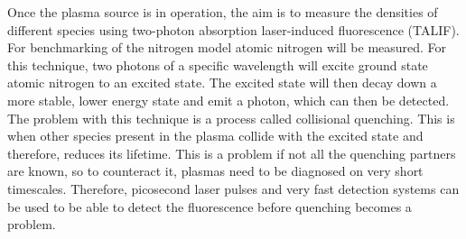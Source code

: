 \documentclass[11pt, oneside]{article}   	%
\begin{document}
Once the plasma source is in operation, the aim is to measure the densities of different species using two-photon absorption laser-induced fluorescence (TALIF).
For benchmarking of the nitrogen model atomic nitrogen will be measured.
For this technique, two photons of a specific wavelength will excite ground state atomic nitrogen to an excited state.
The excited state will then decay down a more stable, lower energy state and emit a photon, which can then be detected.
The problem with this technique is a process called collisional quenching. 
This is when other species present in the plasma collide with the excited state and therefore, reduces its lifetime.
This is a problem if not all the quenching partners are known, so to counteract it, plasmas need to be diagnosed on very short timescales.
Therefore, picosecond laser pulses and very fast detection systems can be used to be able to detect the fluorescence before quenching becomes a problem.
\end{document}
